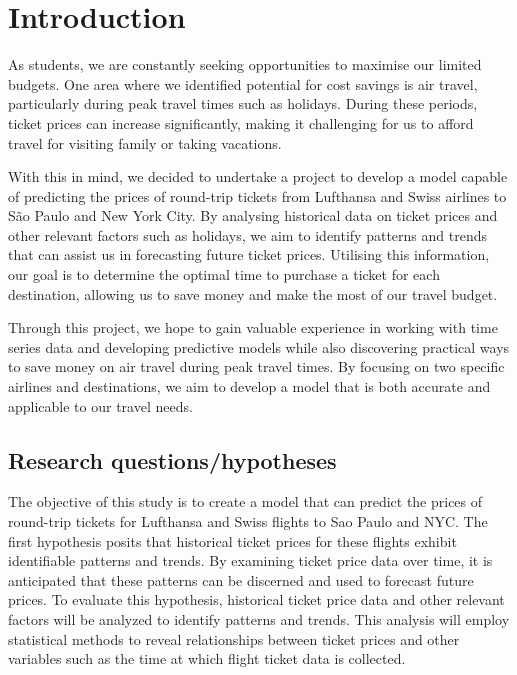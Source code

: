 \section{Introduction}
\label{chap:introduction}

As students, we are constantly seeking opportunities to maximise our limited budgets. 
One area where we identified potential for cost savings is air travel, particularly during peak travel times such as holidays. 
During these periods, ticket prices can increase significantly, making it challenging for us to afford travel for visiting family or taking vacations.

With this in mind, we decided to undertake a project to develop a model capable of predicting the prices of round-trip tickets from Lufthansa and Swiss airlines to São Paulo and New York City.
By analysing historical data on ticket prices and other relevant factors such as holidays, we aim to identify patterns and trends that can assist us in forecasting future ticket prices.
Utilising this information, our goal is to determine the optimal time to purchase a ticket for each destination, allowing us to save money and make the most of our travel budget.

Through this project, we hope to gain valuable experience in working with time series data and developing predictive models while also discovering practical ways to save money on air travel during peak travel times.
By focusing on two specific airlines and destinations, we aim to develop a model that is both accurate and applicable to our travel needs.

\subsection{Research questions/hypotheses}
\label{sec:quesstion}

The objective of this study is to create a model that can predict the prices of round-trip tickets for Lufthansa and Swiss flights to Sao Paulo and NYC. 
The first hypothesis posits that historical ticket prices for these flights exhibit identifiable patterns and trends. 
By examining ticket price data over time, it is anticipated that these patterns can be discerned and used to forecast future prices. 
To evaluate this hypothesis, historical ticket price data and other relevant factors will be analyzed to identify patterns and trends. 
This analysis will employ statistical methods to reveal relationships between ticket prices and other variables such as the time at which flight ticket data is collected.

